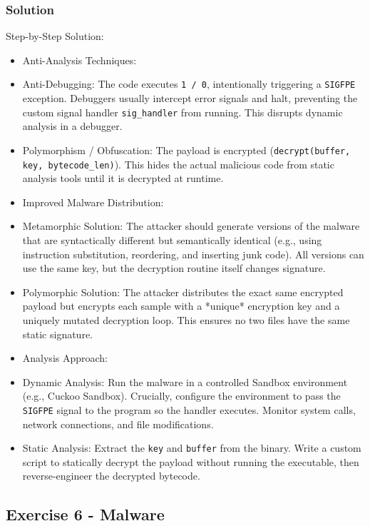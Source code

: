\documentclass{article}
\begin{document}
\subsubsection*{Solution}
Step-by-Step Solution:

\begin{itemize}
    \item[\textbf{1.}] Anti-Analysis Techniques:
    \item Anti-Debugging: The code executes \texttt{1 / 0}, intentionally triggering a \texttt{SIGFPE} exception. Debuggers usually intercept error signals and halt, preventing the custom signal handler \texttt{sig\_handler} from running. This disrupts dynamic analysis in a debugger.
    \item Polymorphism / Obfuscation: The payload is encrypted (\texttt{decrypt(buffer, key, bytecode\_len)}). This hides the actual malicious code from static analysis tools until it is decrypted at runtime.

    \item[\textbf{2.}] Improved Malware Distribution:
    \item Metamorphic Solution: The attacker should generate versions of the malware that are syntactically different but semantically identical (e.g., using instruction substitution, reordering, and inserting junk code). All versions can use the same key, but the decryption routine itself changes signature.
    \item Polymorphic Solution: The attacker distributes the exact same encrypted payload but encrypts each sample with a *unique* encryption key and a uniquely mutated decryption loop. This ensures no two files have the same static signature.

    \item[\textbf{3.}] Analysis Approach:
    \item Dynamic Analysis: Run the malware in a controlled Sandbox environment (e.g., Cuckoo Sandbox). Crucially, configure the environment to pass the \texttt{SIGFPE} signal to the program so the handler executes. Monitor system calls, network connections, and file modifications.
    \item Static Analysis: Extract the \texttt{key} and \texttt{buffer} from the binary. Write a custom script to statically decrypt the payload without running the executable, then reverse-engineer the decrypted bytecode.
\end{itemize}

\subsection{Exercise 6 - Malware}
\end{document}
